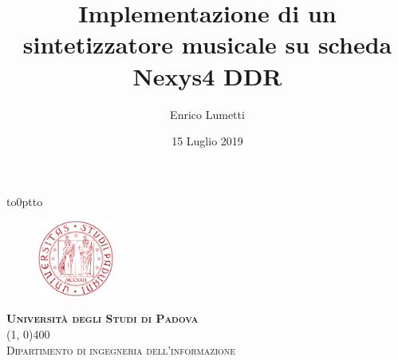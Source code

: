 \documentclass[italian,11pt,a4paper,twoside,openright]{book}
\makeatletter
\def\advisor#1{\gdef\@advisor{#1}}
\def\mastername#1{\gdef\@mastername{#1}}
\makeatother
\begin{document}
\author{Enrico Lumetti}
\title{Implementazione di un sintetizzatore musicale su scheda Nexys4 DDR}
\advisor{Daniele Vogrig}
\mastername{Ingegneria dell'Informazione}
\date{15 Luglio 2019}


\thispagestyle{empty}
\begin{center}
	\vbox to0pt{\vbox to\vss}
	\begin{figure}
		\centering
		\includegraphics[height=2.5cm]{resources/unipd-bn}
	\end{figure}
	
	
	\scshape{\Large{\bfseries{Università degli Studi di Padova}}} \\
	\line(1, 0){400} \\
	\scshape{\large{Dipartimento di ingegneria dell'informazione}} \\
	

\end{center}
\end{document}
